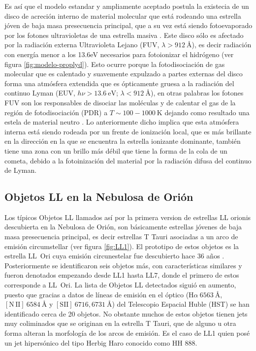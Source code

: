 \documentclass{article}
\newcommand\U[1]{\ensuremath{\mathrm{#1}}}
\newcommand\K{\U{K}}
\newcommand\ha{\ensuremath{\mathrm{H}\alpha}}
\newcommand\nii{\ensuremath{\mathrm{[N\,II]}}}
\begin{document}
Es así que el modelo estandar y ampliamente aceptado postula la existecia de un  disco de acreción interno de material molecular que está rodeando una estrella jóven de baja masa presecuencia principal, que a su vez está siendo fotoevaporado por los fotones ultravioletas de una estrella masiva \citep{Johnstone:1998, Henney:1998a}. Este disco sólo es afectado por la radiación externa Ultravioleta Lejano (FUV, \(\lambda > 912~\text{\AA{}} \)), es decir radiación con energía menor a los 13.6eV necesarios para fotoionizar el hidrógeno (ver figura \ref{fig:modelo-proplyd}). Esto ocurre porque la fotodisociación de gas molecular que es calentado y suavemente expulzado a partes externas del disco forma una atmósfera extendida que es ópticamente gruesa a la radiación del continuo Lyman (EUV, \(h\nu > 13.6~\text{eV}\); \(\lambda < 912~\text{\AA{}} \)), en otras palabras los fotones FUV son los responsables de disociar las moléculas y de calentar el gas de la región de fotodisociación (PDR) a \(T\sim100-1000~\K\) dejando como resultado una estela de material neutro \citep{Johnstone:1998}. Lo anteriormente dicho implica que esta atmósfera interna está siendo rodeada por un frente de ionización local, que es más brillante en la dirección en la que se encuentra la estrella ionizante dominante, también tiene una zona con un brillo más débil que tiene la forma de la cola de un cometa, debido a la fotoinización del material por la radiación difusa del continuo de Lyman.\\ 

\subsection{Objetos LL en la  Nebulosa de Orión}
\label{sec:objeto-ll}

Los típicos Objetos LL llamados así por la primera version de estrellas LL orionis descubierta en la Nebulosa de Orión, son  básicamente estrellas jóvenes de baja masa presecuencia principal, es decir estrellas T Tauri asociadas a un arco de emisión circumstellar (ver figura \ref{fig:LL1}). El prototipo de estos objetos es la estrella LL~Ori cuya emisión circunestelar fue descubierto hace 36 años \citep{Gull:1979a}. Posteriormente se identificaron seis objetos más, con características similares \citep{Bally:2001a} y fueron denotados empezando desde LL1 hasta LL7, donde el primero de estos corresponde a LL~Ori. La lista de Objetos LL detectados siguió en aumento, puesto que gracias a datos de líneas de emisión en el óptico (\(\ha~6563~\text{\AA{}}\), \(\nii~6584~\text{\AA{}}\) y \([\text{SII}]~6716,6731~\text{\AA{}}\)) del Telescopio Espacial Huble (HST) \citep{Bally:2000a, Bally:2006a} se han identificado cerca de 20 objetos. No obstante muchos de estos objetos tienen jets muy coliminados que se originan en la estrella T Tauri, que de alguno u otra forma alteran la morfología de los arcos de emisión. Es el caso de LL1 quien posé un jet hipersónico del tipo Herbig Haro conocido como HH 888.\\
\end{document}

